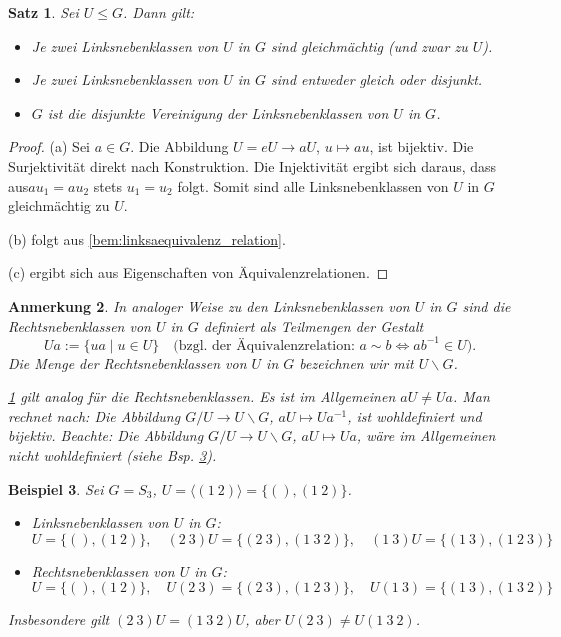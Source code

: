 \documentclass[a4paper, twoside, 11pt, ngerman]{report}
\theoremstyle{definistyle}
\newtheorem{satz}{Satz}[section]
\newtheorem{anm}[satz]{Anmerkung}
\newtheorem{bsp}[satz]{Beispiel}
\theoremstyle{remark}
\begin{document}
\begin{satz}\label{satz:linksklassen_eigenschaften}
Sei $U \leq G$. Dann gilt:
\begin{itemize}
    \item[(a)] Je zwei Linksnebenklassen von $U$ in $G$ sind gleichmächtig (und zwar zu $U$).
    \item[(b)] Je zwei Linksnebenklassen von $U$ in $G$ sind entweder gleich oder disjunkt.
    \item[(c)] $G$ ist die disjunkte Vereinigung der Linksnebenklassen von $U$ in $G$.
\end{itemize}
\end{satz}

\begin{proof}
(a) Sei $a \in G$. Die Abbildung $U=eU \to aU$, $u \mapsto au$, ist bijektiv. Die Surjektivität direkt nach Konstruktion. Die Injektivität ergibt sich daraus, dass aus$au_1 = au_2$ stets $u_1 = u_2$ folgt. Somit sind alle Linksnebenklassen von $U$ in $G$ gleichmächtig zu $U$.

(b) folgt aus \ref{bem:linksaequivalenz_relation}.

(c) ergibt sich aus Eigenschaften von Äquivalenzrelationen.
\end{proof}

\begin{anm}\label{anm:rechtsnebenklassen}
In analoger Weise zu den Linksnebenklassen von $U$ in $G$ sind die Rechtsnebenklassen von $U$ in $G$ definiert als Teilmengen der Gestalt
\[
Ua := \{ ua \mid u \in U \} \quad \text{(bzgl. der Äquivalenzrelation: } a \sim b \iff ab^{-1} \in U\text{)}.
\]
Die Menge der Rechtsnebenklassen von $U$ in $G$ bezeichnen wir mit $U \backslash G$. 

\ref{satz:linksklassen_eigenschaften} gilt analog für die Rechtsnebenklassen. Es ist im Allgemeinen $aU \neq Ua$. Man rechnet nach: Die Abbildung $G/U \to U \backslash G$, $aU \mapsto Ua^{-1}$, ist wohldefiniert und bijektiv. Beachte: Die Abbildung $G/U \to U \backslash G$, $aU \mapsto Ua$, wäre im Allgemeinen nicht wohldefiniert (siehe Bsp. \ref{bsp:linksklassen_rechtsklassen}).
\end{anm}

\begin{bsp}\label{bsp:linksklassen_rechtsklassen}
Sei $G = S_3$, $U = \langle (1 \ 2) \rangle = \{ (), (1 \ 2) \}$.
\begin{itemize}
    \item Linksnebenklassen von $U$ in $G$:
    \[
    U = \{ (), (1 \ 2) \}, \quad (2 \ 3)U = \{ (2 \ 3), (1 \ 3 \ 2) \}, \quad (1 \ 3)U = \{ (1 \ 3), (1 \ 2 \ 3) \}
    \]
    \item Rechtsnebenklassen von $U$ in $G$:
    \[
    U = \{ (), (1 \ 2) \}, \quad U(2 \ 3) = \{ (2 \ 3), (1 \ 2 \ 3) \}, \quad U(1 \ 3) = \{ (1 \ 3), (1 \ 3 \ 2) \}
    \]
\end{itemize}
Insbesondere gilt $(2 \ 3)U = (1 \ 3 \ 2)U$, aber $U(2 \ 3) \neq U(1 \ 3 \ 2)$.
\end{bsp}
\end{document}

